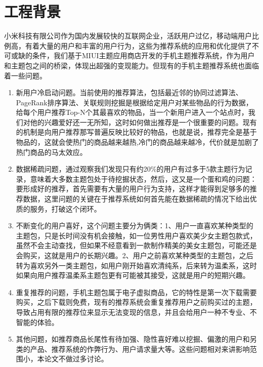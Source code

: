 \section{工程背景}
	小米科技有限公司作为国内发展较快的互联网企业，活跃用户过亿，移动端用户比例高，有着大量的用户和丰富的用户行为，这些为推荐系统的应用和优化提供了不可或缺的条件，我们基于MIUI主题应用商店开发的手机主题推荐系统，作为用户和主题包之间的桥梁，体现出超强的变现能力。但现有的手机主题推荐系统也面临着一些问题。
	\begin{enumerate}[(1)]
	\item 新用户冷启动问题。当前使用的推荐算法，包括最近邻的协同过滤算法、PageRank排序算法、关联规则挖掘是根据给定用户对某些物品的行为数据，给每个用户推荐Top-N个其最喜欢的物品，当一个新用户进入一个站点时，我们对他的兴趣爱好还一无所知，这时如何做出推荐是一个很重要的问题。现有的机制是向用户推荐那写普遍反映比较好的物品，也就是说，推荐完全是基于物品的，这就会使热门的商品越来越热,冷门的商品越来越冷，代价就是加剧了热门商品的马太效应。

	\item 数据稀疏问题，通过观察我们发现只有约20\%的用户有过多于5款主题行为记录，意味着大多数主题包处于待挖掘状态，然后，这又是一个蛋和鸡的问题：要形成好的推荐，首先需要有大量的用户行为支持，这样才能得到足够多的推荐数据，这里问题的关键在于推荐系统如何首先能在数据稀疏的情况下给出优质的服务，打破这个闭环。

	\item 不断变化的用户喜好，这个问题主要分为俩类：1、用户一直喜欢某种类型的主题包，只是长时间没有机会接触，如一位男性用户喜欢美少女主题包款式，虽然不会主动查找，但如果不经意看到一款制作精美的美女主题包，可能还是会购买，这就是用户的长期兴趣。2、用户之前喜欢某种类型的主题包，之后转为喜欢另外一类主题包，如用户刚开始喜欢清纯系，后来转为温柔系，这时如果向用户推荐温柔系主题包更有可能被其接受，这就是用户的短期兴趣。

	\item 重复推荐的问题，手机主题包属于电子虚拟商品，它的特性是第一次下载需要购买，之后下载则免费，现有的推荐系统会重复推荐用户之前购买过的主题，导致占用有限的推荐位来显示无法变现的信息，并且会给用户一种不专业、不智能的体验。

	\item 其他问题，如推荐商品长尾性有待加强、隐性喜好\citep{latent-cf}难以挖掘、偏激的用户和另类的产品、推荐系统的作弊行为、用户请求量大等。这些问题相对来讲影响范围小，本论文不做过多讨论。
	\end{enumerate}

